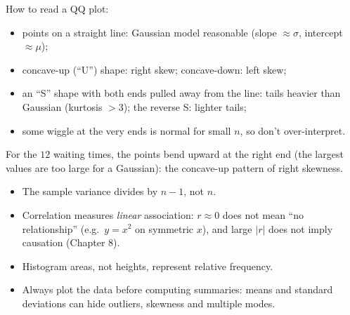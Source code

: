 How to read a QQ plot:
\begin{itemize}
  \item points on a straight line: Gaussian model reasonable (slope $\approx\sigma$,
        intercept $\approx\mu$);
  \item concave-up (``U'') shape: right skew; concave-down: left skew;
  \item an ``S'' shape with both ends pulled away from the line: tails heavier than
        Gaussian (kurtosis $>3$); the reverse S: lighter tails;
  \item some wiggle at the very ends is normal for small $n$, so don't over-interpret.
\end{itemize}

\begin{center}
\end{center}
For the $12$ waiting times, the points bend upward at the right end (the largest values are
too large for a Gaussian): the concave-up pattern of right skewness.

\begin{important}
\begin{itemize}
  \item The sample variance divides by $n-1$, not $n$.
  \item Correlation measures \emph{linear} association: $r\approx 0$ does not mean ``no
        relationship'' (e.g.\ $y=x^2$ on symmetric $x$), and large $|r|$ does not imply
        causation (Chapter 8).
  \item Histogram areas, not heights, represent relative frequency.
  \item Always plot the data before computing summaries: means and standard deviations
        can hide outliers, skewness and multiple modes.
\end{itemize}
\end{important}

